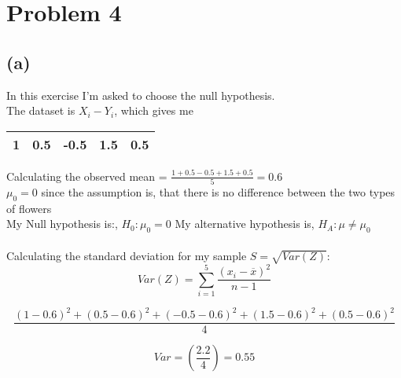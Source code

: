 \section{Problem 4}
\subsection{(a)}
In this exercise I'm asked to choose the null hypothesis.
\\
The dataset is $ X_i - Y_i $, which gives me
\begin{center}
    \begin{tabular}{ |c|c|c|c|c| } 
     \hline
      1 & 0.5 & -0.5 & 1.5 & 0.5\\ 
     \hline
    \end{tabular}
    \end{center}

Calculating the observed mean = $ \frac{1 + 0.5 - 0.5 + 1.5 + 0.5}{5} = 0.6 $
\\
$ \mu_0 = 0 $ since the assumption is, that there is no difference between the two types of flowers
\\
My Null hypothesis is:, $ H_0 : \mu_0 = 0 $
My alternative hypothesis is, $H_A : \mu \neq \mu_0$
\\
\\
Calculating the standard deviation for my sample $ S = \sqrt{Var(Z)}$:
$$ Var(Z) = \sum_{i=1}^{5} \frac{(x_i - \overline{x})^2}{n-1} $$

$$ \frac{(1 - 0.6)^2 + (0.5 - 0.6)^2 + (-0.5 - 0.6)^2 + (1.5 - 0.6)^2 + (0.5 - 0.6)^2}{4} $$

$$ Var = (\frac{2.2}{4}) = 0.55 $$